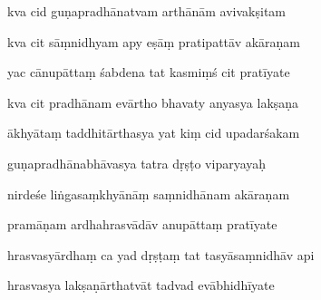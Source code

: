 \documentclass[article,12pt,a4paper]{memoir}%
\newcounter{parCount}
\begin{document}
	  
	  \pstart {} kva cid guṇapradhānatvam arthānām avivakṣitam 
	{}
	\pend%
      

	  
	  \pstart \leavevmode%
	kva cit sāṃnidhyam apy eṣāṃ pratipattāv akāraṇam 
	{}
	\pend%
      

	  
	  \pstart {} yac cānupāttaṃ śabdena tat kasmiṃś cit pratīyate 
	{}
	\pend%
      

	  
	  \pstart \leavevmode%
	kva cit pradhānam evārtho bhavaty anyasya lakṣaṇa 
	{}
	\pend%
      

	  
	  \pstart {} ākhyātaṃ taddhitārthasya yat kiṃ cid upadarśakam 
	{}
	\pend%
      

	  
	  \pstart \leavevmode%
	guṇapradhānabhāvasya tatra dṛṣṭo viparyayaḥ 
	{}
	\pend%
      

	  
	  \pstart {} nirdeśe liṅgasaṃkhyānāṃ saṃnidhānam akāraṇam 
	{}
	\pend%
      

	  
	  \pstart \leavevmode%
	pramāṇam ardhahrasvādāv anupāttaṃ pratīyate 
	{}
	\pend%
      

	  
	  \pstart {} hrasvasyārdhaṃ ca yad dṛṣṭaṃ tat tasyāsaṃnidhāv api 
	{}
	\pend%
      

	  
	  \pstart \leavevmode%
	hrasvasya lakṣaṇārthatvāt tadvad evābhidhīyate 
	{}
	\pend%
      
\end{document}
